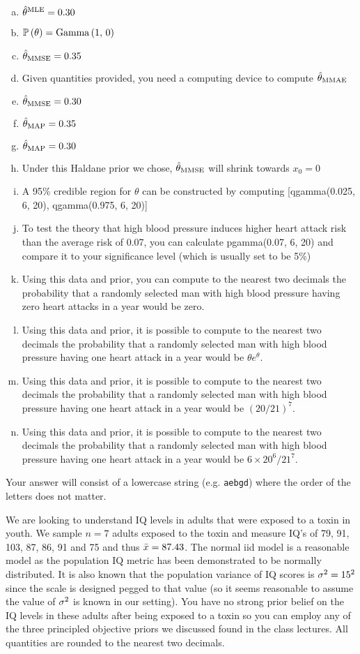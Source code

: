 \documentclass[12pt,landscape]{article}
\newcommand{\instr}{\small Your answer will consist of a lowercase string (e.g. \texttt{aebgd}) where the order of the letters does not matter. \normalsize}
\begin{document}
\vspace{-0.2cm}\benum{} 

\begin{enumerate}[(a)]
\item $\hat{\theta}^{\mathrm{MLE}} = 0.30$ 
\item $\mathbb{P}\left(\theta\right) = \mathrm{Gamma}\left(1,\,0\right)$
\item $\hat{\theta}_{\mathrm{MMSE}} = 0.35$ 
\item Given quantities provided, you need a computing device to compute $\hat{\theta}_{\mathrm{MMAE}}$
\item $\hat{\theta}_{\mathrm{MMSE}} = 0.30$ 
\item $\hat{\theta}_{\mathrm{MAP}} = 0.35$ 
\item $\hat{\theta}_{\mathrm{MAP}} = 0.30$ 
\item Under this Haldane prior we chose, $\hat{\theta}_{\mathrm{MMSE}}$ will shrink towards $x_0 = 0$
\item A 95\% credible region for $\theta$ can be constructed by computing [qgamma(0.025, 6, 20), qgamma(0.975, 6, 20)]
\item To test the theory that high blood pressure induces higher heart attack risk than the average risk of 0.07, you can calculate pgamma(0.07, 6, 20) and compare it to your significance level (which is usually set to be 5\%)
\item Using this data and prior, you can compute to the nearest two decimals the probability that a randomly selected man with high blood pressure having zero heart attacks in a year would be zero.
\item Using this data and prior, it is possible to compute to the nearest two decimals the probability that a randomly selected man with high blood pressure having one heart attack in a year would be $\theta e^\theta$.
\item Using this data and prior, it is possible to compute to the nearest two decimals the probability that a randomly selected man with high blood pressure having one heart attack in a year would be $(20 / 21)^7$.
\item Using this data and prior, it is possible to compute to the nearest two decimals the probability that a randomly selected man with high blood pressure having one heart attack in a year would be $6 \times 20^6 / 21^7$.
\end{enumerate}
\eenum\instr\pagebreak


\problem{} We are looking to understand IQ levels in adults that were exposed to a toxin in youth. We sample $n = 7$ adults exposed to the toxin and measure IQ's of 79,  91, 103,  87,  86,  91 and  75 and thus $\bar{x} = 87.43$. The normal iid model is a reasonable model as the population IQ metric has been demonstrated to be normally distributed. It is also known that the population variance of IQ scores is $\sigma^2 = 15^2$ since the scale is designed pegged to that value (so it seems reasonable to assume the value of $\sigma^2$ is known in our setting). You have no strong prior belief on the IQ levels in these adults after being exposed to a toxin so you can employ any of the three principled objective priors we discussed found in the class lectures. All quantities are rounded to the nearest two decimals.
\end{document}
